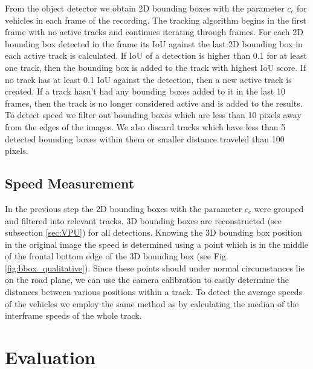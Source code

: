 \documentclass[twocolumn]{svjour3}          \smartqed  \usepackage{graphicx}
\begin{document}
From the object detector we obtain 2D bounding boxes with the parameter $c_c$ for vehicles in each frame of the recording. The tracking algorithm begins in the first frame with no active tracks and continues iterating through frames. For each 2D bounding box detected in the frame its IoU against the last 2D bounding box in each active track is calculated. If IoU of a detection is higher than 0.1 for at least one track, then the bounding box is added to the track with highest IoU score. If no track has at least 0.1 IoU against the detection, then a new active track is created. If a track hasn't had any bounding boxes added to it in the last 10 frames, then the track is no longer considered active and is added to the results. To detect speed we filter out bounding boxes which are less than 10 pixels away from the edges of the images. We also discard tracks which have less than 5 detected bounding boxes within them or smaller distance traveled than 100 pixels.

\subsection{Speed Measurement}

In the previous step the 2D bounding boxes with the parameter $c_c$ were grouped and filtered into relevant tracks. 3D bounding boxes are reconstructed (see subsection \ref{sec:VPU}) for all detections. Knowing the 3D bounding box position in the original image the speed is determined using a point which is in the middle of the frontal bottom edge of the 3D bounding box (see Fig. \ref{fig:bbox_qualitative}). Since these points should under normal circumstances lie on the road plane, we can use the camera calibration to easily determine the distances between various positions within a track. To detect the average speeds of the vehicles we employ the same method as \cite{brnocompspeed} by calculating the median of the interframe speeds of the whole track.


\section{Evaluation}
\end{document}

